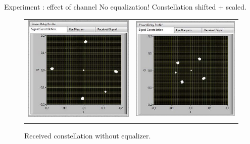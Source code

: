 \documentclass{beamer}
\begin{document}
\begin{frame}{Experiment : effect of channel}
No equalization! Constellation shifted + scaled.


\begin{figure}[h!]
    \centering
    \begin{tabular}{cc}
     \includegraphics[scale = 0.45]{con1} & \includegraphics[scale = 0.45]{con2}\\
     & 
    \end{tabular}
    
    \caption{Received constellation without equalizer.}
    \label{con1}
\end{figure}



\end{frame}
\end{document}
